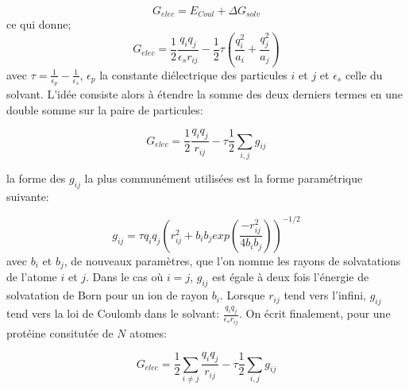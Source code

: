 \begin{equation}
  \label{eq:GB}
  G_{elec} =  E_{Coul} + \Delta G_{solv}
\end{equation}
ce qui donne;
\begin{equation}
  \label{eq:GB}
 G_{elec} =  \frac{1}{2}  \frac{q_iq_j}{\epsilon_s r_{ij}} - \frac{1}{2}  \tau ( \frac{q_i^2}{a_i} +  \frac{q_j^2}{a_j})
\end{equation}
avec $ \tau = \frac{1}{\epsilon_p} - \frac{1}{\epsilon_s}$, $\epsilon_p$ la constante diélectrique des particules $i$ et $j$ et $\epsilon_s$ celle du solvant. L'idée consiste alors à étendre la somme des deux derniers termes en une double somme sur la paire de particules:

\begin{equation}
  G_{elec} = \frac{1}{2} \frac{q_iq_j}{r_{ij}} - \tau \frac{1}{2} \sum_{i,j} g_{ij}
\end{equation}

la forme des $g_{ij}$ la plus communément utilisées est la forme paramétrique suivante:


\begin{equation}
  \label{eq:GBg}
  g_{ij}= \tau q_iq_j (r^2_{ij} + b_ib_j exp(\frac{-r^2_{ij}}{4b_ib_j}))^{-1/2} 
\end{equation}
avec $b_i$ et $b_j$, de nouveaux paramètres, que l'on nomme les rayons de solvatations de l'atome $i$ et $j$. Dans le cas où $i=j$, $g_{ij}$ est égale à deux fois l'énergie de solvatation de Born pour un ion de rayon $b_i$. Lorsque $r_{ij}$ tend vers l'infini, $g_{ij}$ tend vers la loi de Coulomb dans le solvant: $\frac{q_iq_j}{\epsilon_s r_{ij}}$. On écrit finalement, pour une protéine consitutée de $N$ atomes:

\begin{equation}
  G_{elec} = \frac{1}{2} \sum_{i \neq j} \frac{q_iq_j}{r_{ij}} - \tau \frac{1}{2} \sum_{i,j} g_{ij}
\end{equation}



